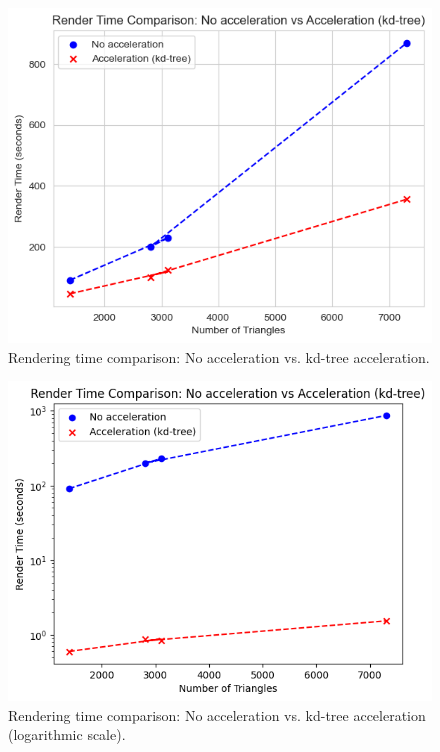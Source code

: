 \documentclass[unicode,11pt,a4paper,oneside,numbers=endperiod,openany]{scrartcl}
\begin{document}
\begin{figure}[H]
    \centering
    \includegraphics[width=\textwidth]{comparison.png}
    \caption{Rendering time comparison: No acceleration vs. kd-tree acceleration.}
    \label{fig:comparison-linear}
\end{figure}

\begin{figure}[H]
    \centering
    \includegraphics[width=\textwidth]{comparison_log.png}
    \caption{Rendering time comparison: No acceleration vs. kd-tree acceleration (logarithmic scale).}
    \label{fig:comparison-log}
\end{figure}
\end{document}
